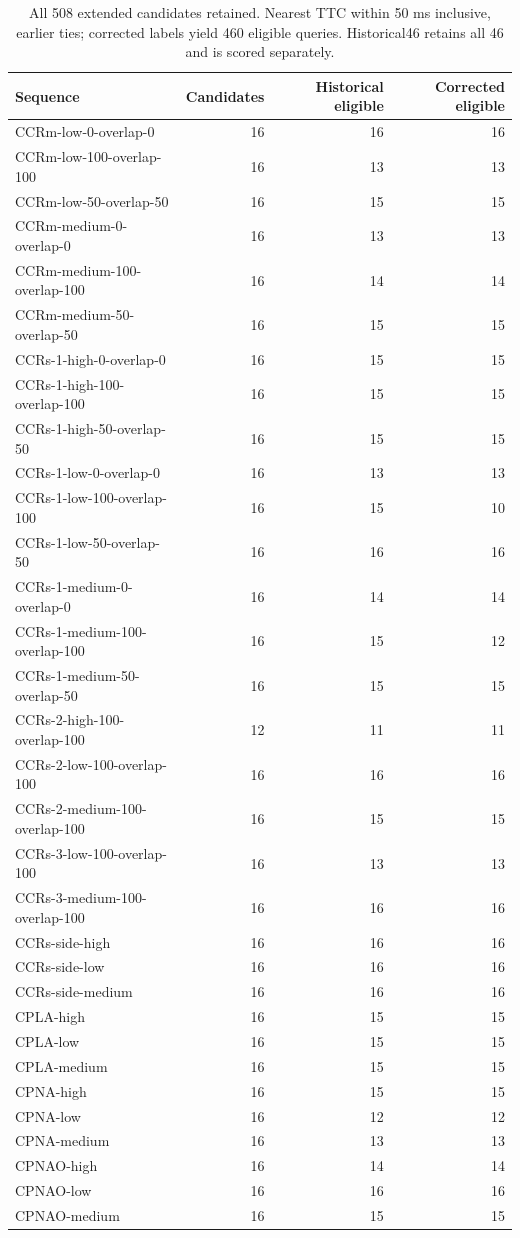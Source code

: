 \begingroup\scriptsize\setlength{\tabcolsep}{3pt}
\begin{longtable}{lrrr}
\caption{All 508 extended candidates retained. Nearest TTC within 50 ms inclusive, earlier ties; corrected labels yield 460 eligible queries. Historical46 retains all 46 and is scored separately.}\label{tab:audit-transfer-eligibility}\\
\toprule
Sequence & Candidates & Historical eligible & Corrected eligible \\
\midrule
CCRm-low-0-overlap-0 & 16 & 16 & 16 \\
CCRm-low-100-overlap-100 & 16 & 13 & 13 \\
CCRm-low-50-overlap-50 & 16 & 15 & 15 \\
CCRm-medium-0-overlap-0 & 16 & 13 & 13 \\
CCRm-medium-100-overlap-100 & 16 & 14 & 14 \\
CCRm-medium-50-overlap-50 & 16 & 15 & 15 \\
CCRs-1-high-0-overlap-0 & 16 & 15 & 15 \\
CCRs-1-high-100-overlap-100 & 16 & 15 & 15 \\
CCRs-1-high-50-overlap-50 & 16 & 15 & 15 \\
CCRs-1-low-0-overlap-0 & 16 & 13 & 13 \\
CCRs-1-low-100-overlap-100 & 16 & 15 & 10 \\
CCRs-1-low-50-overlap-50 & 16 & 16 & 16 \\
CCRs-1-medium-0-overlap-0 & 16 & 14 & 14 \\
CCRs-1-medium-100-overlap-100 & 16 & 15 & 12 \\
CCRs-1-medium-50-overlap-50 & 16 & 15 & 15 \\
CCRs-2-high-100-overlap-100 & 12 & 11 & 11 \\
CCRs-2-low-100-overlap-100 & 16 & 16 & 16 \\
CCRs-2-medium-100-overlap-100 & 16 & 15 & 15 \\
CCRs-3-low-100-overlap-100 & 16 & 13 & 13 \\
CCRs-3-medium-100-overlap-100 & 16 & 16 & 16 \\
CCRs-side-high & 16 & 16 & 16 \\
CCRs-side-low & 16 & 16 & 16 \\
CCRs-side-medium & 16 & 16 & 16 \\
CPLA-high & 16 & 15 & 15 \\
CPLA-low & 16 & 15 & 15 \\
CPLA-medium & 16 & 15 & 15 \\
CPNA-high & 16 & 15 & 15 \\
CPNA-low & 16 & 12 & 12 \\
CPNA-medium & 16 & 13 & 13 \\
CPNAO-high & 16 & 14 & 14 \\
CPNAO-low & 16 & 16 & 16 \\
CPNAO-medium & 16 & 15 & 15 \\
\bottomrule
\end{longtable}
\endgroup
